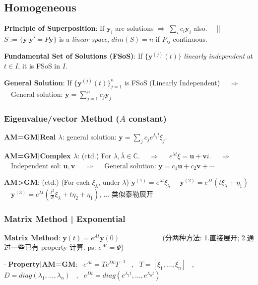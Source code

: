\documentclass[8pt]{extarticle}
\begin{document}
\subsection{Homogeneous}

\begin{minipage}[t]{0.60\textwidth}

    \textbf{Principle of Superposition}: If $\mathbf{y}_i$ are solutions $\Rightarrow \ \sum_ic_i\mathbf{y}_i$ also. \ \ || \ \ { $S:=\{\mathbf{y}|\mathbf{y}'=P\mathbf{y}\}$ is a \textit{linear space}, $dim(S)=n$ if $P_{ij}$ continuous.}

    \textbf{Fundamental Set of Solutions (FSoS)}: If $\{\mathbf{y}^{(j)}(t)\}$ \textit{linearly independent} at $t\in I$, it is FSoS in $I$.

    \textbf{General Solution}: If $\{\mathbf{y}^{(j)}(t)\}_{j=1}^n$ is FSoS (Linearly Independent) \ \ $\Rightarrow$ \ \ General solution: $\mathbf{y}=\sum_{j=1}^nc_j\mathbf{y}_j$

    \subsubsection{Eigenvalue/vector Method ($A$ constant)}

    \textbf{AM=GM|Real $\lambda$}: general solution: $\mathbf{y}=\sum_jc_je^{\lambda_jt}\xi_j$.
    
    \textbf{AM=GM|Complex $\lambda$}: (ctd.) For $\lambda,\overline{\lambda}\in\mathbb{C}$. \ \ $\Rightarrow$ \ \ $e^{\lambda t}\xi=\mathbf{u}+\mathbf{v}i$. \ \ $\Rightarrow$ \ \ Independent sol: $\mathbf{u},\mathbf{v}$ \ \ $\Rightarrow$ \ \ General solution: $\mathbf{y} = c_1\mathbf{u} + c_2\mathbf{v} + \cdots$
    
    \textbf{AM>GM}: (ctd.) {\scriptsize (For each $\xi_\lambda$, under $\lambda$)} $\mathbf{y}^{(1)}=e^{\lambda t}\xi_\lambda$ \ \ $\mathbf{y}^{(2)}=e^{\lambda t}(t\xi_\lambda+\eta_1)$ \ \ $\mathbf{y}^{(3)}=e^{\lambda t}(\frac{t^2}{2!}\xi_\lambda+t\eta_2+\eta_1)$, ... {\tiny 类似泰勒展开}

    \subsubsection{Matrix Method | Exponential}

    \textbf{Matrix Method}: $\mathbf{y}(t)=e^{At}\mathbf{y}(0)$ \ \ \ \ \ \ \ \ \ \ \ { (分两种方法: 1.直接展开; 2.通过一些已有 property 计算. ps: $e^{At}=\Psi$)}

    $\cdot$ \textbf{Property|AM=GM}: \ $e^{At}=Te^{Dt}T^{-1}$ \ , \ $T=[\xi_1,...,\xi_n]$ \ , \ $D=diag(\lambda_1,...,\lambda_n)$ \ , \ $e^{Dt}=diag(e^{\lambda_1t},...,e^{\lambda_nt})$


\end{minipage}
\end{document}
